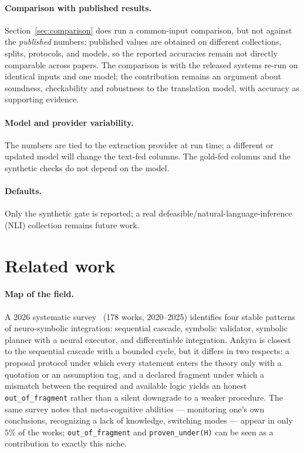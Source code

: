 \documentclass[11pt,a4paper]{article}
\begin{document}
\paragraph{Comparison with published results.} Section~\ref{sec:comparison} does run a
common-input comparison, but not against the \emph{published} numbers: published values are
obtained on different collections, splits, protocols, and models, so the reported accuracies
remain not directly comparable across papers. The comparison is with the released systems
re-run on identical inputs and one model; the contribution remains an argument about
soundness, checkability and robustness to the translation model, with accuracy as supporting
evidence.

\paragraph{Model and provider variability.} The numbers are tied to the extraction provider
at run time; a different or updated model will change the text-fed columns. The gold-fed
columns and the synthetic checks do not depend on the model.

\paragraph{Defaults.} Only the synthetic gate is reported; a real
defeasible/natural-language-inference (NLI) collection remains future work.

\section{Related work}
\label{sec:related}

\paragraph{Map of the field.} A 2026 systematic survey~\cite{survey2026} (178 works,
2020--2025) identifies four stable patterns of neuro-symbolic integration: sequential
cascade, symbolic validator, symbolic planner with a neural executor, and differentiable
integration. Ankyra is closest to the sequential cascade with a bounded cycle, but it
differs in two respects: a proposal protocol under which every statement enters the theory
only with a quotation or an assumption tag, and a declared fragment under which a mismatch
between the required and available logic yields an honest \texttt{out\_of\_fragment} rather
than a silent downgrade to a weaker procedure. The same survey notes that meta-cognitive
abilities --- monitoring one's own conclusions, recognizing a lack of knowledge, switching
modes --- appear in only $5\%$ of the works; \texttt{out\_of\_fragment} and
\texttt{proven\_under(H)} can be seen as a contribution to exactly this niche.
\end{document}
